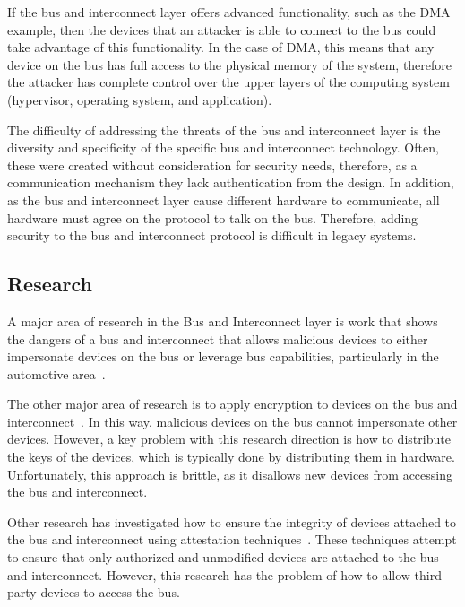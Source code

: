 \documentclass[11pt,letterpaper]{article}
\begin{document}
If the bus and interconnect layer offers advanced functionality, such
as the DMA example, then the devices that an attacker is able to connect
to the bus could take advantage of this functionality. In the case of
DMA, this means that any device on the bus has full access to the
physical memory of the system, therefore the attacker has complete
control over the upper layers of the computing system (hypervisor,
operating system, and application).

The difficulty of addressing the threats of the bus and interconnect
layer is the diversity and specificity of the specific bus and
interconnect technology. Often, these were created without
consideration for security needs, therefore, as a communication
mechanism they lack authentication from the design. In addition, as
the bus and interconnect layer cause different hardware to
communicate, all hardware must agree on the protocol to talk on the
bus. Therefore, adding security to the bus and interconnect protocol
is difficult in legacy systems.  

\subsection{Research}

A major area of research in the Bus and Interconnect layer is work
that shows the dangers of a bus and interconnect that allows malicious
devices to either impersonate devices on the bus or leverage bus
capabilities, particularly in the automotive area~\cite{Bonkoski2013,
  Checkoway2011, Hoppe2008, Koscher2010, Rouf2010, Sang2010}.

The other major area of research is to apply encryption to devices on
the bus and interconnect~\cite{Groza2012, Herrewege2011, Jiang2012,
  Schweppe2011, Stewin2014, Szilagyi2010}. In this way, malicious
devices on the bus cannot impersonate other devices. However, a key
problem with this research direction is how to distribute the keys of
the devices, which is typically done by distributing them in hardware.
Unfortunately, this approach is brittle, as it disallows new devices
from accessing the bus and interconnect.

Other research has investigated how to ensure the integrity of devices
attached to the bus and interconnect using attestation
techniques~\cite{Li2010, Li2011}. These techniques attempt to ensure
that only authorized and unmodified devices are attached to the bus
and interconnect. However, this research has the problem of how to
allow third-party devices to access the bus.
\end{document}
